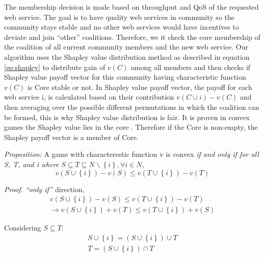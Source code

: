 \documentclass[10pt, conference, compsocconf]{IEEEtran}
\theoremstyle{plain}
\theoremstyle{definition}
\begin{document}
The membership decision is made based on throughput and QoS of the requested web service. The goal is to have quality web services in community so the community stays stable and no other web services would have incentives to deviate and join ``other'' coalitions. Therefore, we it check the core membership of the coalition of all current community members and the new web service. Our algorithm uses the Shapley value distribution method as described in equation \ref{eq:shapley} to distribute gain of $v(C)$ among all members and then checks if Shapley value payoff vector for this community having characteristic function $v(C)$ is Core stable or not. In Shapley value payoff vector, the payoff for each web service i, is calculated based on their contribution $v(C \cup {i}) - v(C)$ and then averaging over the possible different permutations in which the coalition can be formed, this is why Shapley value distribution is fair. It is proven in convex games the Shapley value lies in the core \cite{DBLP:conf/ijcai/GrecoMPS11, myerson1991game}. Therefore if the Core is non-empty, the Shapley payoff vector is a member of Core.


\emph{Proposition: } A game with characterestic function v is convex \emph{if and only if for all S, T, and i where} $S \subseteq T \subseteq N \backslash \left\{i\right\}, \forall i \in N$, 
\begin{equation}\label{eq:convex_snow}
v(S \cup \left\{i\right\}) - v(S) \leq v (T \cup \left\{i\right\}) - v(T)
\end{equation}

\emph{Proof. ``only if''} direction, 
\setlength{\abovedisplayshortskip}{2pt}
\begin{gather*}\label{convexsnowproof}
v(S \cup \left\{i\right\}) - v(S) \leq v (T \cup \left\{i\right\}) - v(T)
\\
\rightarrow v(S \cup \left\{i\right\}) + v(T) \leq v (T \cup \left\{i\right\}) + v(S)
\end{gather*}

Considering $S \subseteq T$:
\setlength{\abovedisplayshortskip}{2pt}
\begin{gather*}
S \cup \left\{i\right\} = (S \cup \left\{i\right\}) \cup T
\\
T = (S \cup \left\{i\right\}) \cap T
\end{gather*}
\end{document}

